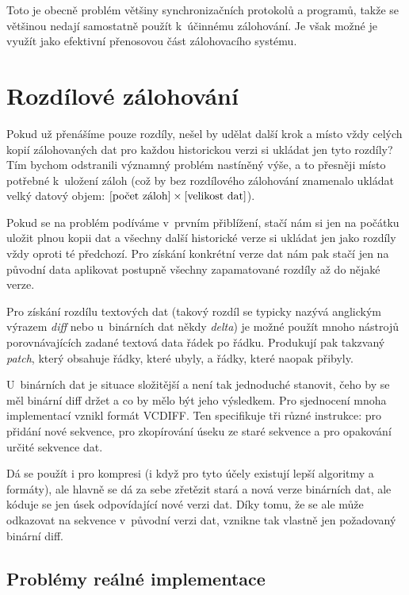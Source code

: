 Toto je obecně problém většiny synchronizačních protokolů a programů, takže se
většinou nedají samostatně použít k~účinnému zálohování. Je však možné je
využít jako efektivní přenosovou část zálohovacího systému.

\section{Rozdílové zálohování}

Pokud už přenášíme pouze rozdíly, nešel by udělat další krok a místo vždy celých
kopií zálohovaných dat pro každou historickou verzi si ukládat jen tyto rozdíly?
Tím bychom odstranili významný problém nastíněný výše, a to přesněji místo
potřebné k~uložení záloh (což by bez rozdílového zálohování znamenalo ukládat
velký datový objem: $[\hbox{počet záloh}]\times[\hbox{velikost dat}]$).

Pokud se na problém podíváme v~prvním přiblížení, stačí nám si jen na počátku
uložit plnou kopii dat a všechny další historické verze si ukládat jen jako
rozdíly vždy oproti té předchozí. Pro získání konkrétní verze dat nám pak stačí
jen na původní data aplikovat postupně všechny zapamatované rozdíly až do nějaké
verze.

Pro získání rozdílu textových dat (takový rozdíl se typicky nazývá anglickým
výrazem {\it diff} nebo u~binárních dat někdy {\it delta}) je možné použít mnoho
nástrojů porovnávajících zadané textová data řádek po řádku. Produkují pak
takzvaný {\it patch}, který obsahuje řádky, které ubyly, a řádky, které naopak
přibyly.


U~binárních dat je situace složitější a není tak jednoduché stanovit, čeho by
se měl binární diff držet a co by mělo být jeho výsledkem. Pro sjednocení mnoha
implementací vznikl formát \gls{VCDIFF}. Ten specifikuje tři různé instrukce:
pro přidání nové sekvence, pro zkopírování úseku ze staré sekvence a pro
opakování určité sekvence dat.

Dá se použít i pro kompresi (i když pro tyto účely existují lepší algoritmy a
formáty), ale hlavně se dá za sebe zřetězit stará a nová verze binárních dat,
ale kóduje se jen úsek odpovídající nové verzi dat. Díky tomu, že se ale může
odkazovat na sekvence v~původní verzi dat, vznikne tak vlastně jen požadovaný
binární diff.

\subsection*{Problémy reálné implementace}

